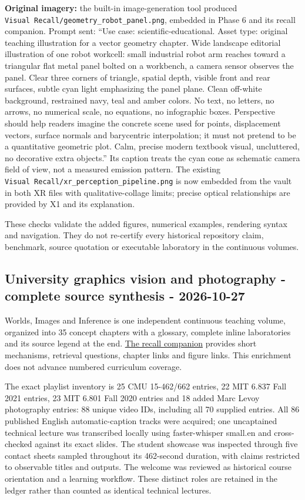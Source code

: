 \textbf{Original imagery:} the built-in image-generation tool produced \texttt{Visual\ Recall/geometry\_robot\_panel.png}, embedded in Phase 6 and its recall companion. Prompt sent: ``Use case: scientific-educational. Asset type: original teaching illustration for a vector geometry chapter. Wide landscape editorial illustration of one robot workcell: small industrial robot arm reaches toward a triangular flat metal panel bolted on a workbench, a camera sensor observes the panel. Clear three corners of triangle, spatial depth, visible front and rear surfaces, subtle cyan light emphasizing the panel plane. Clean off-white background, restrained navy, teal and amber colors. No text, no letters, no arrows, no numerical scale, no equations, no infographic boxes. Perspective should help readers imagine the concrete scene used for points, displacement vectors, surface normals and barycentric interpolation; it must not pretend to be a quantitative geometric plot. Calm, precise modern textbook visual, uncluttered, no decorative extra objects.'' Its caption treats the cyan cone as schematic camera field of view, not a measured emission pattern. The existing \texttt{Visual\ Recall/xr\_perception\_pipeline.png} is now embedded from the vault in both XR files with qualitative-collage limits; precise optical relationships are provided by X1 and its explanation.

These checks validate the added figures, numerical examples, rendering syntax and navigation. They do not re-certify every historical repository claim, benchmark, source quotation or executable laboratory in the continuous volumes.

\subsection{University graphics vision and photography - complete source synthesis - 2026-10-27}\label{appendix-a103e7846d21-university-graphics-vision-and-photography---complete-source-synthesis---2026-10-27}

{Worlds, Images and Inference} is one independent continuous teaching volume, organized into 35 concept chapters with a glossary, complete inline laboratories and its source legend at the end. \hyperref[appendix-a8f634b076b5]{The recall companion} provides short mechanisms, retrieval questions, chapter links and figure links. This enrichment does not advance numbered curriculum coverage.

The exact playlist inventory is 25 CMU 15-462/662 entries, 22 MIT 6.837 Fall 2021 entries, 23 MIT 6.801 Fall 2020 entries and 18 added Marc Levoy photography entries: 88 unique video IDs, including all 70 supplied entries. All 86 published English automatic-caption tracks were acquired; one uncaptained technical lecture was transcribed locally using faster-whisper small.en and cross-checked against its exact slides. The student showcase was inspected through five contact sheets sampled throughout its 462-second duration, with claims restricted to observable titles and outputs. The welcome was reviewed as historical course orientation and a learning workflow. These distinct roles are retained in the ledger rather than counted as identical technical lectures.

